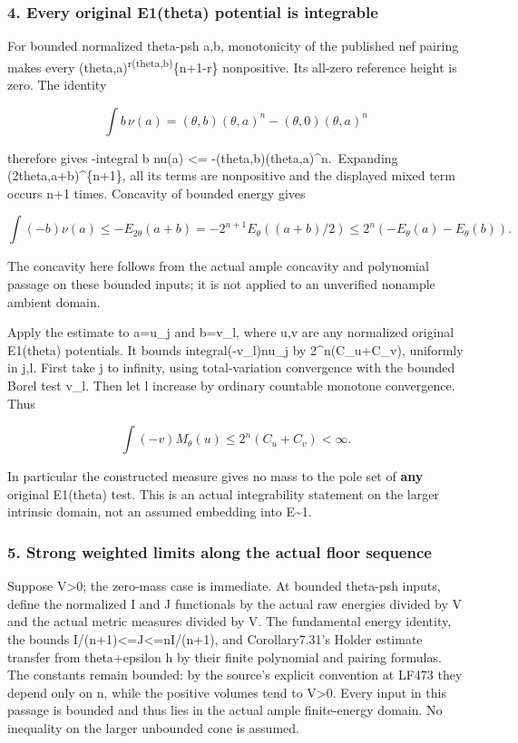 \documentclass[
]{article}
\begin{document}
\subsubsection{4. Every original E1(theta) potential is
integrable}\label{every-original-e1theta-potential-is-integrable}

For bounded normalized theta-psh a,b, monotonicity of the published nef
pairing makes every (theta,a)\textsuperscript{r(theta,b)}\{n+1-r\}
nonpositive. Its all-zero reference height is zero. The identity

\[\int b\,\nu(a)=(\theta,b)(\theta,a)^n-(\theta,0)(\theta,a)^n\]

therefore gives -integral b nu(a) \textless=
-(theta,b)(theta,a)\^{}n.~Expanding (2theta,a+b)\^{}\{n+1\}, all its
terms are nonpositive and the displayed mixed term occurs n+1 times.
Concavity of bounded energy gives

\[\int(-b)\nu(a)\leq-E_{2\theta}(a+b)
=-2^{n+1}E_\theta((a+b)/2)
\leq2^n(-E_\theta(a)-E_\theta(b)).\]

The concavity here follows from the actual ample concavity and
polynomial passage on these bounded inputs; it is not applied to an
unverified nonample ambient domain.

Apply the estimate to a=u\_j and b=v\_l, where u,v are any normalized
original E1(theta) potentials. It bounds integral(-v\_l)nu\_j by
2\^{}n(C\_u+C\_v), uniformly in j,l. First take j to infinity, using
total-variation convergence with the bounded Borel test v\_l. Then let l
increase by ordinary countable monotone convergence. Thus

\[\int(-v)M_\theta(u)\leq2^n(C_u+C_v)<\infty.\]

In particular the constructed measure gives no mass to the pole set of
\textbf{any} original E1(theta) test. This is an actual integrability
statement on the larger intrinsic domain, not an assumed embedding into
E\textasciitilde1.

\subsubsection{5. Strong weighted limits along the actual floor
sequence}\label{strong-weighted-limits-along-the-actual-floor-sequence}

Suppose V\textgreater0; the zero-mass case is immediate. At bounded
theta-psh inputs, define the normalized I and J functionals by the
actual raw energies divided by V and the actual metric measures divided
by V. The fundamental energy identity, the bounds
I/(n+1)\textless=J\textless=nI/(n+1), and Corollary7.31's Holder
estimate transfer from theta+epsilon h by their finite polynomial and
pairing formulas. The constants remain bounded: by the source's explicit
convention at LF473 they depend only on n, while the positive volumes
tend to V\textgreater0. Every input in this passage is bounded and thus
lies in the actual ample finite-energy domain. No inequality on the
larger unbounded cone is assumed.
\end{document}
